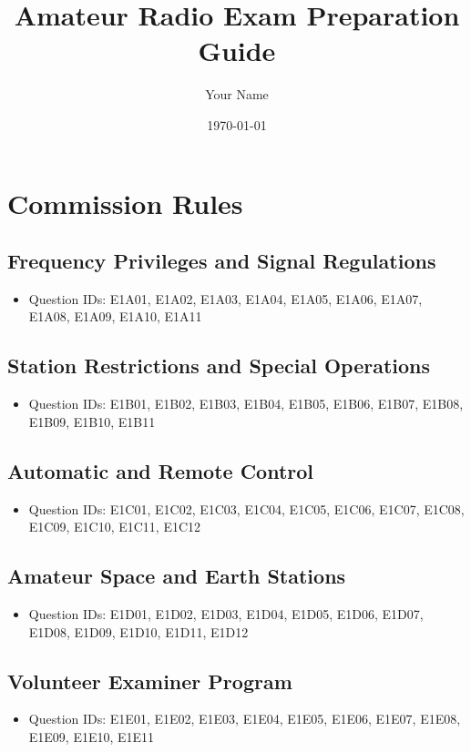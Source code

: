 \documentclass{book}
\title{Amateur Radio Exam Preparation Guide}
\author{Your Name}
\date{\today}
\begin{document}
\maketitle

\tableofcontents

\chapter{Commission Rules}
\section{Frequency Privileges and Signal Regulations}
\begin{itemize}
    \item Question IDs: E1A01, E1A02, E1A03, E1A04, E1A05, E1A06, E1A07, E1A08, E1A09, E1A10, E1A11
\end{itemize}

\section{Station Restrictions and Special Operations}
\begin{itemize}
    \item Question IDs: E1B01, E1B02, E1B03, E1B04, E1B05, E1B06, E1B07, E1B08, E1B09, E1B10, E1B11
\end{itemize}

\section{Automatic and Remote Control}
\begin{itemize}
    \item Question IDs: E1C01, E1C02, E1C03, E1C04, E1C05, E1C06, E1C07, E1C08, E1C09, E1C10, E1C11, E1C12
\end{itemize}

\section{Amateur Space and Earth Stations}
\begin{itemize}
    \item Question IDs: E1D01, E1D02, E1D03, E1D04, E1D05, E1D06, E1D07, E1D08, E1D09, E1D10, E1D11, E1D12
\end{itemize}

\section{Volunteer Examiner Program}
\begin{itemize}
    \item Question IDs: E1E01, E1E02, E1E03, E1E04, E1E05, E1E06, E1E07, E1E08, E1E09, E1E10, E1E11
\end{itemize}
\end{document}
